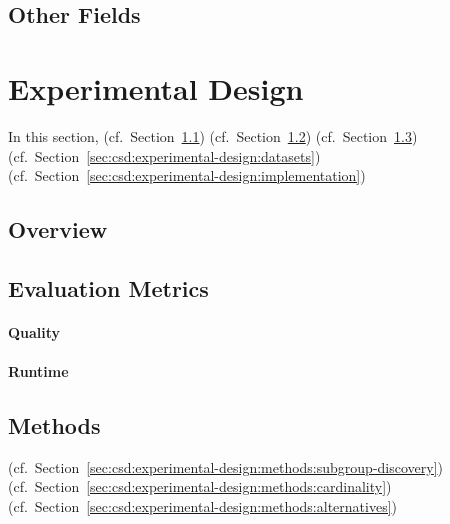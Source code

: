 \documentclass{article}
\theoremstyle{definition}
\begin{document}
\cite{bach2022empirical} \cite{bach2023finding}

\subsection{Other Fields}
\label{sec:csd:related-work:other}

\cite{bailey2014alternative} \cite{grossi2017survey}
\cite{guidotti2022counterfactual}
\cite{narodytska2018learning} \cite{schidler2021sat} \cite{yu2021learning}

\section{Experimental Design}
\label{sec:csd:experimental-design}

In this section, (cf.~Section~\ref{sec:csd:experimental-design:overview}) (cf.~Section~\ref{sec:csd:experimental-design:metrics}) (cf.~Section~\ref{sec:csd:experimental-design:methods}) (cf.~Section~\ref{sec:csd:experimental-design:datasets}) (cf.~Section~\ref{sec:csd:experimental-design:implementation})

\subsection{Overview}
\label{sec:csd:experimental-design:overview}

\subsection{Evaluation Metrics}
\label{sec:csd:experimental-design:metrics}

\paragraph{Quality}

\paragraph{Runtime}

\subsection{Methods}
\label{sec:csd:experimental-design:methods}

(cf.~Section~\ref{sec:csd:experimental-design:methods:subgroup-discovery}) (cf.~Section~\ref{sec:csd:experimental-design:methods:cardinality}) (cf.~Section~\ref{sec:csd:experimental-design:methods:alternatives})
\end{document}
